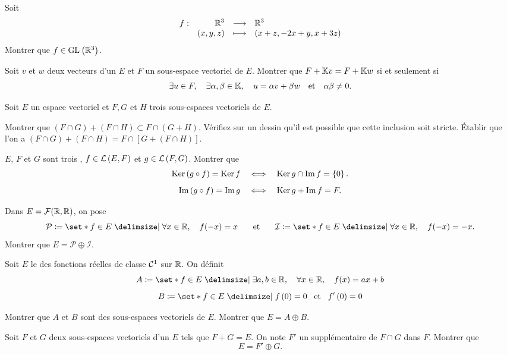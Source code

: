 \documentclass{magnolia}
\begin{document}
Soit
\[\begin{array}[t]{lrcl} \displaystyle{f} : & \displaystyle{\mathbb{R}^3} & \longrightarrow & \displaystyle{\mathbb{R}^3} \\ & \displaystyle{(x,y,z)} & \longmapsto & \displaystyle{(x+z,-2x+y,x+3z)} \end{array}\]
Montrer que $f\in{\rm GL}_{}\left(\mathbb{R}^3\right)$.



Soit $v$ et $w$ deux vecteurs d'un \Kev $E$ et $F$ un sous-espace vectoriel de $E$.
Montrer que $F+\mathbb{K} v=F+\mathbb{K} w$ si et seulement si
\[\exists u \in F ,\quad \exists \alpha,\beta \in \mathbb{K} ,\quad u=\alpha v+\beta
  w \quad \text{et} \quad \alpha\beta\not=0.\]

Soit $E$ un espace vectoriel et $F,G$ et $H$ trois sous-espaces vectoriels de $E$.
\begin{questions}
\question  Montrer que $(F\cap G)+(F\cap H)\subset F\cap (G+H)$.
  Vérifiez sur un dessin qu'il est possible que cette inclusion soit stricte.
\question Établir que l'on a $(F\cap G)+(F\cap H)=F\cap [G+(F\cap H)]$.
\end{questions}

$E$, $F$   et  $G$  sont  trois \Kevs, $f\in\mathcal{L}\left(E,F\right)$  et  $g\in\mathcal{L}\left(F,G\right)$.
Montrer que
\[\mathop{\rm Ker}\left(g \circ f\right) = \mathop{\rm Ker} f \quad\Longleftrightarrow\quad
  \mathop{\rm Ker} g \cap \operatorname{Im} f  = \left\{0\right\}.\]
\[\operatorname{Im}\left(g \circ f\right) = \operatorname{Im} g \quad\Longleftrightarrow\quad
  \mathop{\rm Ker} g+\operatorname{Im} f = F.\]


Dans $E=\mathcal{F}(\mathbb{R},\mathbb{R})$, on pose
\[\mathcal{P}\defeq\enstq{f\in E}{\forall x\in\R\qsep f(-x)=x} \quad\et\quad
  \mathcal{I}\defeq\enstq{f\in E}{\forall x\in\R\qsep f(-x)=-x}.\]
Montrer que $E=\mathcal{P}\oplus\mathcal{I}$.

Soit $E$ le \Rev des fonctions réelles de classe $\mathcal{C}^{1}$ sur $\mathbb{R}$. On
définit
\[A\defeq\enstq{f\in E}{\exists a,b\in\R \qsep \forall x\in\R \qsep f(x)=ax+b}\]
\[B\defeq\enstq{f\in E}{f\p{0}=0 \et f'\p{0}=0}\]
\begin{questions}
\question Montrer que $A$ et $B$ sont des sous-espaces vectoriels de $E$.
\question Montrer que $E=A\oplus B$.
\end{questions}


Soit $F$ et $G$ deux sous-espaces vectoriels d'un \Kev $E$ tels que $F+G=E$. On
note $F'$ un supplémentaire de $F\cap G$ dans $F$. Montrer que
\[E=F'\oplus G.\]

\end{document}
